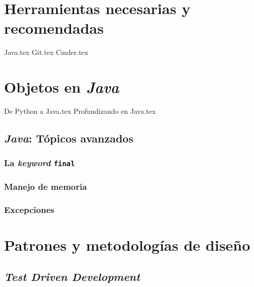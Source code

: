 \documentclass[12pt]{book}
\begin{document}
  \frontmatter
  \maketitle
  \tableofcontents
  

  \mainmatter
  \part{Herramientas necesarias y recomendadas}
    {Java.tex}
    {Git.tex}
    {Cmder.tex}
  \part{Objetos en \textit{Java}}
    
    {De Python a Java.tex}
    {Profundizando en Java.tex}
    \chapter{\textit{Java}: Tópicos avanzados}
      \label{ch:java-2}
      \section{La \textit{keyword} \texttt{final}}
        \label{sec:final}
      \section{Manejo de memoria}
        \label{sec:memory}
      \section{Excepciones}
        \label{sec:exceptions}
  \part{Patrones y metodologías de diseño}
    \chapter{\textit{Test Driven Development}}
      \label{ch:tdd}
\end{document}
